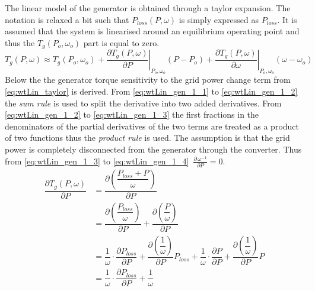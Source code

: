 The linear model of the generator is obtained through a taylor expansion. The notation is relaxed a bit such that $ P_{loss}( P, \omega) $ is simply expressed as $ P_{loss} $. It is assumed that the system is linearised around an equilibrium operating point and thus the $ T_g(P_o, \omega_o) $ part is equal to zero.
\begin{equation}\label{eq:wtLin_taylor}
	T_g( P, \omega) \approx T_g(P_o, \omega_o) + 
	\left. \dfrac{\partial T_g( P, \omega)}{\partial P} \right |_{P_o,\omega_o} ( P-P_o) + 
	\left. \dfrac{\partial T_g( P, \omega)}{\partial \omega} \right |_{P_o,\omega_o} (\omega - \omega_o)
\end{equation}
Below the the generator torque sensitivity to the grid power change term from \cref{eq:wtLin_taylor} is derived. From \cref{eq:wtLin_gen_1_1} to \cref{eq:wtLin_gen_1_2} the \textit{sum rule} is used to split the derivative into two added derivatives. From \cref{eq:wtLin_gen_1_2} to \cref{eq:wtLin_gen_1_3} the first fractions in the denominators of the partial derivatives of the two terms are treated as a product of two functions thus the \textit{product rule} is used. The assumption is that the grid power is completely disconnected from the generator through the converter. Thus from \cref{eq:wtLin_gen_1_3} to \cref{eq:wtLin_gen_1_4} $ \, \frac{\partial \, \omega^{-1}}{\partial P} = 0 $.
\begin{align} 
	\dfrac{\partial T_g( P, \omega)}{\partial P} &= \dfrac{\partial \left (\dfrac{P_{loss} +  P}{\omega}\right )}{\partial P} \label{eq:wtLin_gen_1_1} \\
	& = \dfrac{\partial \left (\dfrac{P_{loss}}{\omega} \right )}{\partial P} + \dfrac{\partial \left ( \dfrac{ P}{\omega} \right )}{\partial P} \label{eq:wtLin_gen_1_2} \\
	& = \dfrac{1}{\omega} \cdot \dfrac{\partial P_{loss}}{\partial P} + \dfrac{\partial \left ( \dfrac{1}{\omega} \right )}{\partial P} P_{loss} + \dfrac{1}{\omega} \cdot \dfrac{\partial P}{\partial P} + \dfrac{\partial \left (\dfrac{1}{\omega} \right )}{\partial P}  P \label{eq:wtLin_gen_1_3} \\
	& = \dfrac{1}{\omega} \cdot \dfrac{\partial P_{loss}}{\partial P} + \dfrac{1}{\omega} \label{eq:wtLin_gen_1_4}
\end{align}


